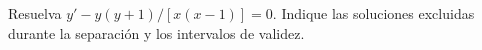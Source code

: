 Resuelva $y'-y(y+1)/[x(x-1)]=0$. Indique las soluciones excluidas durante la separación y los intervalos de validez.
